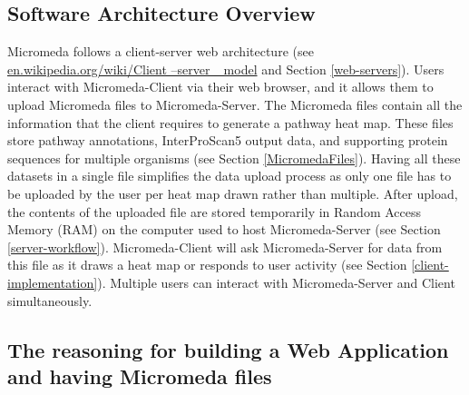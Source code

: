 \subsection{Software Architecture Overview}

Micromeda follows a client-server web architecture \cite{svobodova1985client} (see \href{en.wikipedia.org/wiki/Client–server\_model}{en.wikipedia.org/wiki/Client –server \_model} and Section \ref{web-servers}). Users interact with Micromeda-Client via their web browser, and it allows them to upload Micromeda files to Micromeda-Server. The Micromeda files contain all the information that the client requires to generate a pathway heat map. These files store pathway annotations, InterProScan5 output data, and supporting protein sequences for multiple organisms (see Section \ref{MicromedaFiles}). Having all these datasets in a single file simplifies the data upload process as only one file has to be uploaded by the user per heat map drawn rather than multiple. After upload, the contents of the uploaded file are stored temporarily in Random Access Memory (RAM) on the computer used to host Micromeda-Server (see Section \ref{server-workflow}). Micromeda-Client will ask Micromeda-Server for data from this file as it draws a heat map or responds to user activity (see Section \ref{client-implementation}). Multiple users can interact with Micromeda-Server and Client simultaneously.

\subsection{The reasoning for building a Web Application and having Micromeda files}

